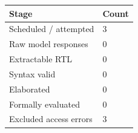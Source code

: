 \begin{tabular}{ll}
\toprule
Stage & Count \\
\midrule
Scheduled / attempted & 3 \\
Raw model responses & 0 \\
Extractable RTL & 0 \\
Syntax valid & 0 \\
Elaborated & 0 \\
Formally evaluated & 0 \\
Excluded access errors & 3 \\
\bottomrule
\end{tabular}
